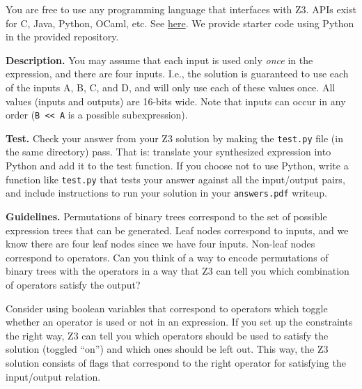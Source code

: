 \documentclass[11pt]{article}
\begin{document}
You are free to use any programming language that interfaces with Z3. APIs exist
for C, Java, Python, OCaml, etc. See
\href{http://z3prover.github.io/api/html/index.html}{here}.  We provide starter
code using Python in the provided repository.


\vspace{1em}
\noindent\textbf{Description.} You may assume that each input is used only
  \emph{once} in the expression, and there are four inputs. I.e., the solution is
  guaranteed to use each of the inputs A, B, C, and D, and will only use
  each of these values once.
All values (inputs and outputs) are 16-bits wide.
Note that inputs can occur in any order (\texttt{B << A} is a possible
  subexpression).

\vspace{1em}
\noindent\textbf{Test.}  Check your answer from your Z3 solution by making the
\texttt{test.py} file (in the same directory) pass. That is: translate your
synthesized expression into Python and add it to the test function.  If you
choose not to use Python, write a function like \texttt{test.py} that tests your
answer against all the input/output pairs, and include instructions to run your
solution in your \texttt{answers.pdf} writeup.

\vspace{1em}
\noindent\textbf{Guidelines.}  Permutations of binary trees correspond to the set of
possible expression trees that can be generated. Leaf nodes correspond to
inputs, and we know there are four leaf nodes since we have four inputs. Non-leaf
nodes correspond to operators. Can you think of a way to encode
permutations of binary trees with the operators in a way that Z3 can tell you
which combination of operators satisfy the output?

Consider using boolean variables that correspond to operators which toggle
whether an operator is used or not in an expression. If you set up the
constraints the right way, Z3 can tell you which operators should be used to
satisfy the solution (toggled ``on'') and which ones should be left out. This
way, the Z3 solution consists of flags that correspond to the right
operator for satisfying the input/output relation.
\end{document}
